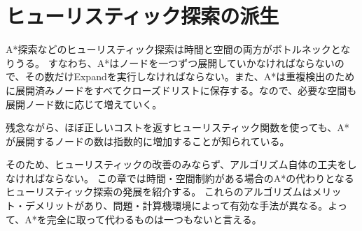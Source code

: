 \chapter{ヒューリスティック探索の派生}
\label{ch:heuristic-search-variants}


A*探索などのヒューリスティック探索は時間と空間の両方がボトルネックとなりうる。
すなわち、A*はノードを一つずつ展開していかなければならないので、その数だけExpandを実行しなければならない。また、A*は重複検出のために展開済みノードをすべてクローズドリストに保存する。なので、必要な空間も展開ノード数に応じて増えていく。

残念ながら、ほぼ正しいコストを返すヒューリスティック関数を使っても、A*が展開するノードの数は指数的に増加することが知られている\cite{helmert:08}。

そのため、ヒューリスティックの改善のみならず、アルゴリズム自体の工夫をしなければならない。
この章では時間・空間制約がある場合のA*の代わりとなるヒューリスティック探索の発展を紹介する。
これらのアルゴリズムはメリット・デメリットがあり、問題・計算機環境によって有効な手法が異なる。よって、A*を完全に取って代わるものは一つもないと言える。


